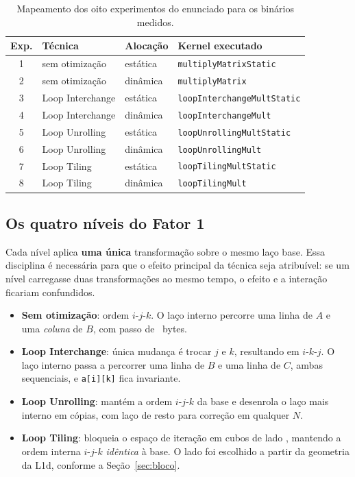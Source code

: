 \documentclass[11pt,a4paper]{article}
\begin{document}
\begin{table}[H]
\centering
\caption{Mapeamento dos oito experimentos do enunciado para os binários medidos.}
\label{tab:mapa}
\small
\begin{tabular}{@{}clll@{}}
\toprule
\textbf{Exp.} & \textbf{Técnica} & \textbf{Alocação} & \textbf{Kernel executado} \\
\midrule
1 & sem otimização   & estática & \texttt{multiplyMatrixStatic} \\
2 & sem otimização   & dinâmica & \texttt{multiplyMatrix} \\
3 & Loop Interchange & estática & \texttt{loopInterchangeMultStatic} \\
4 & Loop Interchange & dinâmica & \texttt{loopInterchangeMult} \\
5 & Loop Unrolling   & estática & \texttt{loopUnrollingMultStatic} \\
6 & Loop Unrolling   & dinâmica & \texttt{loopUnrollingMult} \\
7 & Loop Tiling      & estática & \texttt{loopTilingMultStatic} \\
8 & Loop Tiling      & dinâmica & \texttt{loopTilingMult} \\
\bottomrule
\end{tabular}
\end{table}

\subsection{Os quatro níveis do Fator 1}

Cada nível aplica \textbf{uma única} transformação sobre o mesmo laço base. Essa
disciplina é necessária para que o efeito principal da técnica seja atribuível: se um
nível carregasse duas transformações ao mesmo tempo, o efeito e a interação ficariam
confundidos.

\begin{itemize}
  \item \textbf{Sem otimização}: ordem $i$-$j$-$k$. O laço interno percorre uma linha de
  $A$ e uma \emph{coluna} de $B$, com passo de \valStrideLinha~bytes.
  \item \textbf{Loop Interchange}: única mudança é trocar $j$ e $k$, resultando em
  $i$-$k$-$j$. O laço interno passa a percorrer uma linha de $B$ e uma linha de $C$,
  ambas sequenciais, e \texttt{a[i][k]} fica invariante.
  \item \textbf{Loop Unrolling}: mantém a ordem $i$-$j$-$k$ da base e desenrola o laço
  mais interno em \valUnroll{} cópias, com laço de resto para correção em qualquer $N$.
  \item \textbf{Loop Tiling}: bloqueia o espaço de iteração em cubos de lado
  \valBloco, mantendo a ordem interna $i$-$j$-$k$ \emph{idêntica} à base. O lado
  \valBloco{} foi escolhido a partir da geometria da L1d, conforme a
  Seção~\ref{sec:bloco}.
\end{itemize}
\end{document}
